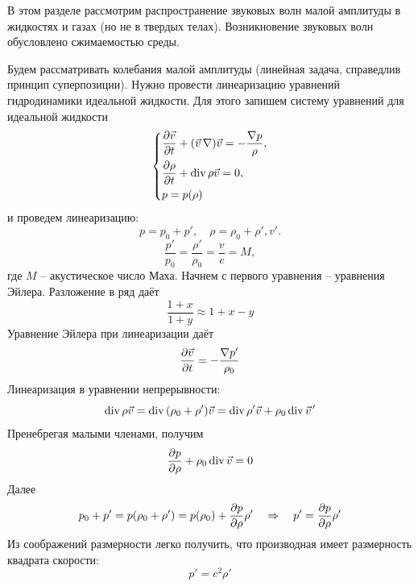 В этом разделе рассмотрим распространение звуковых волн малой амплитуды в жидкостях и газах (но не в твердых телах). Возникновение звуковых волн обусловлено сжимаемостью среды.

Будем рассматривать колебания малой амплитуды (линейная задача, справедлив принцип
суперпозиции). Нужно провести линеаризацию уравнений гидродинамики идеальной жидкости. Для этого запишем систему уравнений для идеальной жидкости
\begin{equation}
	\left\{
	\begin{aligned}
	    &\pdv{\vec{v}}{t}+ \qty(\vec{v}\,\nabla)\vec{v} = - \frac{\nabla p}{\rho},\\
	    &\pdv{\rho}{t}+\operatorname{div} \rho \vec{v} = 0,\\
	    &p=p(\rho)
	\end{aligned}
	\right.
\end{equation}
и проведем линеаризацию:
\begin{equation}
    p=p_0+p', \quad \rho = \rho_0+\rho', v'.
\end{equation}
\begin{equation}
    \frac{p'}{p_0} = \frac{\rho'}{\rho_0} = \frac{v}{c} = M,
\end{equation}
где $M$ -- акустическое число Маха. Начнем с первого уравнения -- уравнения Эйлера. Разложение в ряд даёт
\begin{equation}
    \frac{1+x}{1+y}\approx 1+x-y
\end{equation}
Уравнение Эйлера при линеаризации даёт
\begin{equation}
    \pdv{\vec{v}}{t} = -\frac{\nabla p'}{\rho_0}
\end{equation}
Линеаризация в уравнении непрерывности:
\begin{equation}
    \Div \rho \vec{v} = \Div \qty(\rho_0+\rho')\vec{v} =
    \Div \rho' \vec{v} + \rho_0 \Div \pvec{v}'
\end{equation}
Пренебрегая малыми членами, получим
\begin{equation}
    \pdv{p}{\rho}+\rho_0 \operatorname{div} \vec{v} = 0
\end{equation}
Далее
\begin{equation}
    p_0+p' = p (\rho_0 + \rho') = p (\rho_0)+ 
    \pdv{p}{\rho}\rho' 
    \quad\Rightarrow\quad 
    p' = \pdv{p}{\rho} \rho'
\end{equation}
Из соображений размерности легко получить, что производная имеет размерность квадрата скорости:
\begin{equation}
    p' = c^2 \rho ' 
\end{equation}
